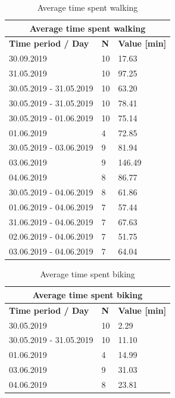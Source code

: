 \begin{table}[]
\begin{tabular}{|l|l|l|}
\hline
\multicolumn{3}{|c|}{\textbf{Average time spent walking}}          \\ \hline
\textbf{Time period / Day} & \textbf{N} & \textbf{Value {[}min{]}} \\ \hline
30.09.2019                 & 10         & 17.63                    \\ \hline
31.05.2019                 & 10         & 97.25                    \\ \hline
30.05.2019 - 31.05.2019    & 10         & 63.20                    \\ \hline
30.05.2019 - 31.05.2019    & 10         & 78.41                    \\ \hline
30.05.2019 - 01.06.2019    & 10         & 75.14                    \\ \hline
01.06.2019                 & 4          & 72.85                    \\ \hline
30.05.2019 - 03.06.2019    & 9          & 81.94                    \\ \hline
03.06.2019                 & 9          & 146.49                   \\ \hline
04.06.2019                 & 8          & 86.77                    \\ \hline
30.05.2019 - 04.06.2019    & 8          & 61.86                    \\ \hline
01.06.2019 - 04.06.2019    & 7          & 57.44                    \\ \hline
31.06.2019 - 04.06.2019    & 7          & 67.63                    \\ \hline
02.06.2019 - 04.06.2019    & 7          & 51.75                    \\ \hline
03.06.2019 - 04.06.2019    & 7          & 64.04                    \\ \hline
\end{tabular}
\label{results-walking}
\caption{Average time spent walking}
\end{table}

\begin{table}[]
\begin{tabular}{|l|l|l|}
\hline
\multicolumn{3}{|c|}{\textbf{Average time spent biking}}           \\ \hline
\textbf{Time period / Day} & \textbf{N} & \textbf{Value {[}min{]}} \\ \hline
30.05.2019                 & 10         & 2.29                     \\ \hline
30.05.2019 - 31.05.2019    & 10         & 11.10                    \\ \hline
01.06.2019                 & 4          & 14.99                    \\ \hline
03.06.2019                 & 9          & 31.03                    \\ \hline
04.06.2019                 & 8          & 23.81                    \\ \hline
\end{tabular}
\label{results-biking}
\caption{Average time spent biking}
\end{table}


